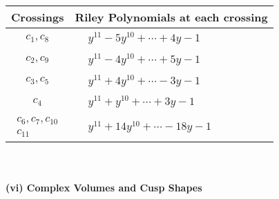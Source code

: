 \documentclass[1p]{elsarticle_modified}
\theoremstyle{definition}
\begin{document}
\begin{tabular}{m{50pt}|m{274pt}}
Crossings & \hspace{64pt}Riley Polynomials at each crossing \\
\hline $$\begin{aligned}c_{1},c_{8}\end{aligned}$$&$\begin{aligned}
&y^{11}-5 y^{10}+\cdots+4 y-1
\end{aligned}$\\
\hline $$\begin{aligned}c_{2},c_{9}\end{aligned}$$&$\begin{aligned}
&y^{11}-4 y^{10}+\cdots+5 y-1
\end{aligned}$\\
\hline $$\begin{aligned}c_{3},c_{5}\end{aligned}$$&$\begin{aligned}
&y^{11}+4 y^{10}+\cdots-3 y-1
\end{aligned}$\\
\hline $$\begin{aligned}c_{4}\end{aligned}$$&$\begin{aligned}
&y^{11}+y^{10}+\cdots+3 y-1
\end{aligned}$\\
\hline $$\begin{aligned}c_{6},c_{7},c_{10}\\c_{11}\end{aligned}$$&$\begin{aligned}
&y^{11}+14 y^{10}+\cdots-18 y-1
\end{aligned}$\\
\hline
\end{tabular}\\~\\
\newpage\flushleft \textbf{(vi) Complex Volumes and Cusp Shapes}
\end{document}

